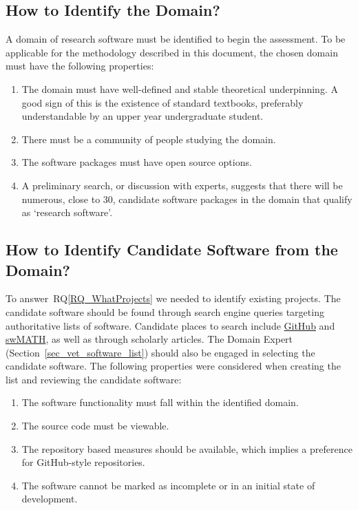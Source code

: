 \documentclass[runningheads]{llncs}
\newcommand{\rqref}[1]{RQ\ref{#1}}
\begin{document}
\subsection{How to Identify the Domain?} \label{SecIdentifyDomain} 

A domain of research software must be identified to begin the assessment. To be
applicable for the methodology described in this document, the chosen domain
must have the following properties:

\begin{enumerate}
\item The domain must have well-defined and stable theoretical underpinning.  A
  good sign of this is the existence of standard textbooks, preferably
  understandable by an upper year undergraduate student.
\item There must be a community of people studying the domain.
\item The software packages must have open source options.
\item A preliminary search, or discussion with experts, suggests that there will
  be numerous, close to 30, candidate software packages in the domain that
  qualify as `research software'.
\end{enumerate}	

\subsection{How to Identify Candidate Software from the Domain?}
\label{identifysoftware}

To answer~\rqref{RQ_WhatProjects} we needed to identify existing projects. The
candidate software should be found through search engine queries targeting
authoritative lists of software.  Candidate places to search include
\href{https://github.com/} {GitHub} and \href{https://swmath.org/} {swMATH}, as
well as through scholarly articles. The Domain Expert
(Section~\ref{sec_vet_software_list}) should also be engaged in selecting the
candidate software.  The following properties were considered when creating the
list and reviewing the candidate software:

\begin{enumerate}
	\item The software functionality must fall within the identified domain.
	\item The source code must be viewable.
	\item The repository based measures should be available, which implies a
	preference for GitHub-style repositories.
	\item The software cannot be marked as incomplete or in an initial state of
	development.
\end{enumerate}
\end{document}
